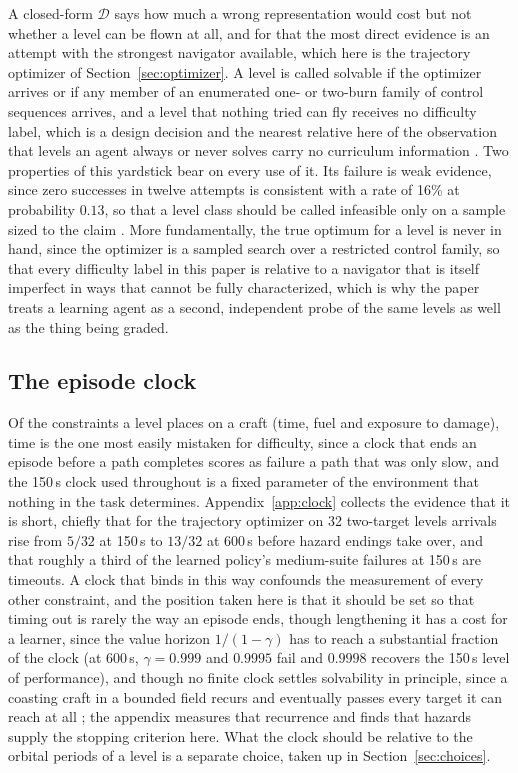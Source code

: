 \documentclass[11pt]{article}
\newcommand{\dd}{\mathcal{D}}
\begin{document}
A closed-form $\dd$ says how much a wrong representation would cost but not
whether a level can be flown at all, and for that the most direct evidence
is an attempt with the strongest navigator available, which here is the
trajectory optimizer of Section~\ref{sec:optimizer}. A level is called
solvable if the optimizer arrives or if any member of an enumerated one- or
two-burn family of control sequences arrives, and a level that nothing
tried can fly receives no difficulty label, which is a design decision and
the nearest relative here of the observation that levels an agent always or
never solves carry no curriculum information
\cite{rutherford2024,dennis2020}. Two properties of this yardstick bear on
every use of it. Its failure is weak evidence, since zero successes in
twelve attempts is consistent with a rate of 16\% at probability $0.13$, so
that a level class should be called infeasible only on a sample sized to
the claim \cite{agarwal2021,colas2018}. More fundamentally, the true optimum for a
level is never in hand, since the optimizer is a sampled search over a
restricted control family, so that every difficulty label in this paper is
relative to a navigator that is itself imperfect in ways that cannot be
fully characterized, which is why the paper treats a learning agent as a
second, independent probe of the same levels as well as the thing being
graded.

\subsection{The episode clock}
\label{sec:clock}

Of the constraints a level places on a craft (time, fuel and exposure to
damage), time is the one most easily mistaken for difficulty, since a clock
that ends an episode before a path completes scores as failure a path that
was only slow, and the 150\,s clock used throughout is a fixed parameter of
the environment that nothing in the task determines.
Appendix~\ref{app:clock} collects the evidence that it is short, chiefly
that for the trajectory optimizer on 32 two-target levels arrivals rise
from $5/32$ at 150\,s to $13/32$ at 600\,s before hazard endings take over,
and that roughly a third of the learned policy's medium-suite failures at
150\,s are timeouts. A clock that binds in this way confounds the
measurement of every other constraint, and the position taken here is that
it should be set so that timing out is rarely the way an episode ends,
though lengthening it has a cost for a learner, since the value horizon
$1/(1-\gamma)$ has to reach a substantial fraction of the clock (at
600\,s, $\gamma = 0.999$ and $0.9995$ fail and $0.9998$ recovers the 150\,s
level of performance), and though no finite clock settles solvability in
principle, since a coasting craft in a bounded field recurs and eventually
passes every target it can reach at all \cite{poincare1890}; the appendix
measures that recurrence and finds that hazards supply the stopping
criterion here. What the clock
should be relative to the orbital periods of a level is a separate choice,
taken up in Section~\ref{sec:choices}.
\end{document}
